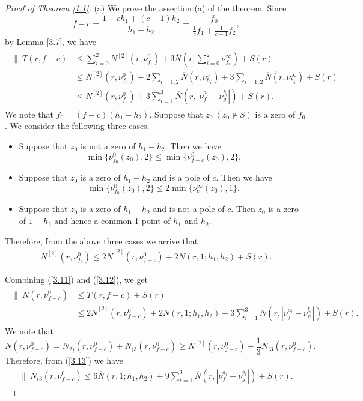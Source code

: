 \documentclass[12pt,leqno]{amsart}
\numberwithin{equation}{section}
\begin{document}
\begin{proof}[Proof of Theorem \ref{1.1}]
(a) We prove the assertion (a) of the theorem. Since 
$$f-c=\frac{1-ch_1+(c-1)h_2}{h_1-h_2}=\frac{f_0}{\frac{1}{c}f_1+\frac{1}{c-1}f_2},$$ by Lemma \ref{3.7}, we have
\begin{align}\label{3.11}
\begin{split}
\|\ T(r,f-c)&\le\sum_{i=0}^{2}N^{[2]}\left(r,\nu^0_{f_i}\right)+3\overline N(r,\sum_{i=0}^2\nu^\infty_{f_i})+S(r)\\
&\leq N^{[2]}\left(r,\nu^0_{f_0}\right)+2\sum_{i=1,2}\overline N\left(r,\nu^0_{h_i}\right)+3\sum_{i=1,2}\overline N\left(r,\nu^\infty_{h_i}\right)+S(r)\\
&\leq N^{[2]}\left(r,\nu^0_{f_0}\right)+3\sum_{i=1}^3\overline N\left(r,|\nu^{a_i}_f-\nu^{b_i}_g|\right)+S(r).
\end{split}
\end{align}
We note that $f_0=(f-c)(h_1-h_2)$. Suppose that $z_0\ (z_0\not\in S)$ is a zero of $f_0$. We consider the following three cases.
\begin{itemize}
\item Suppose that $z_0$ is not a zero of $h_1-h_2$. Then we have
$$\min\{\nu^0_{f_0}(z_0),2\}\le \min\{\nu^0_{f-c}(z_0),2\}.$$
\item Suppose that $z_0$ is a zero of $h_1-h_2$ and is a pole of $c$. Then we have
$$\min\{\nu^0_{f_0}(z_0),2\}\le 2\min\{\nu^\infty_{c}(z_0),1\}.$$
\item Suppose that $z_0$ is a zero of $h_1-h_2$ and is not a pole of $c$. Then  $z_0$ is a zero of $1-h_2$ and hence a common 1-point of $h_1$ and $h_2$.
\end{itemize}
Therefore, from the above three cases we arrive that
\begin{align}
\label{3.12}
N^{[2]}\left(r,\nu^0_{f_0}\right)\le 2\overline N^{[2]}(r,\nu^0_{f-c})+2\overline N(r,1;h_1,h_2)+S(r).
\end{align}

Combining (\ref{3.11}) and (\ref{3.12}), we get
\begin{align}\label{3.13}
\begin{split}
\|\ N(r,\nu^0_{f-c})&\le T(r,f-c)+S(r)\\
&\le 2\overline N^{[2]}(r,\nu^0_{f-c})+2\overline N(r,1;h_1,h_2)+3\sum_{i=1}^3\overline N\left(r,|\nu^{a_i}_f-\nu^{b_i}_g|\right)+S(r).
\end{split}
\end{align}
We note that 
$$N(r,\nu^0_{f-c})=N_{2)}(r,\nu^0_{f-c})+N_{(3}(r,\nu^0_{f-c})\ge N^{[2]}(r,\nu^0_{f-c})+\frac{1}{3}N_{(3}(r,\nu^0_{f-c}).$$
Therefore, from (\ref{3.13}) we have
\begin{align}\label{3.14}
\|\  N_{(3}(r,\nu^0_{f-c})\le 6\overline N(r,1;h_1,h_2)+9\sum_{i=1}^3\overline N\left(r,|\nu^{a_i}_f-\nu^{b_i}_g|\right)+S(r).  
\end{align}


\end{proof}
\end{document}
